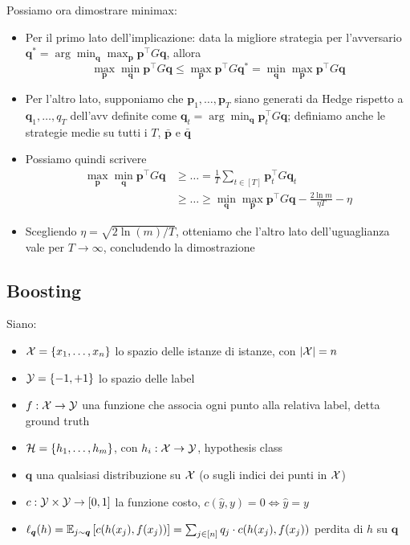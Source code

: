 Possiamo ora dimostrare minimax:
\begin{itemize}
	\item Per il primo lato dell'implicazione: data la migliore strategia per l'avversario $\bm q^\ast = \arg \min_{\bm q} \max_{\bm p} \bm p^\top G \bm q$, allora
	$$ \max_{\bm p} \min_{\bm q} \bm p^\top G \bm q \leq \max_{\bm p} \bm p^\top G \bm q^\ast = \min_{\bm q} \max_{\bm p} \bm p^\top G \bm q $$

	\item Per l'altro lato, supponiamo che $\bm p_1, \dots, \bm p_T$ siano generati da Hedge rispetto a $\bm q_1, \dots, q_T$ dell'avv definite come $\bm q_t = \arg \min_{\bm q} \bm p_t^\top G \bm q$; definiamo anche le strategie medie su tutti i $T$, $\bar{\bm p}$ e $\bar{\bm q}$

	\item Possiamo quindi scrivere
	\begin{align*}
		\max_{\bm p} \min_{\bm q} \bm p^\top G \bm q & \geq \dots = \frac{1}{T} \sum_{t \in [T]} \bm p_t^\top G \bm q_t \\
		& \geq \dots \geq \min_{\bm q} \max_{\bm p} \bm p^\top G \bm q - \frac{2 \ln m}{\eta T} - \eta
	\end{align*}

	\item Scegliendo $\eta = \sqrt{2 \ln (m)/ T}$, otteniamo che l'altro lato dell'uguaglianza vale per $T \rightarrow \infty$, concludendo la dimostrazione
\end{itemize}

\subsection{Boosting}

Siano:
\begin{itemize}
	\item $\mathcal{X} = \left\{x_1, \dots, x_n \right\}$ lo spazio delle istanze di istanze, con $|\mathcal{X}| = n$

	\item $\mathcal{Y} = \left\{-1, +1\right\}$ lo spazio delle label

	\item $f: \mathcal{X} \rightarrow \mathcal{Y}$ una funzione che associa ogni punto alla relativa label, detta ground truth

	\item $\mathcal{H} = \left\{h_1, \dots, h_m \right\}$, con $h_i : \mathcal{X} \rightarrow \mathcal{Y}$, hypothesis class

	\item $\bm q$ una qualsiasi distribuzione su $\mathcal{X}$ (o sugli indici dei punti in $\mathcal{X}$)

	\item $c: \mathcal{Y} \times \mathcal{Y} \rightarrow [0,1]$ la funzione costo, $c(\hat y, y) = 0 \Leftrightarrow \hat y = y$

	\item $\ell_{\bm q} (h) = \mathbb{E}_{j \sim \bm q} \left[c (h (x_j), f(x_j))\right] = \sum_{j \in [n]} q_j \cdot c (h(x_j), f (x_j))$ perdita di $h$ su $\bm q$
\end{itemize}

